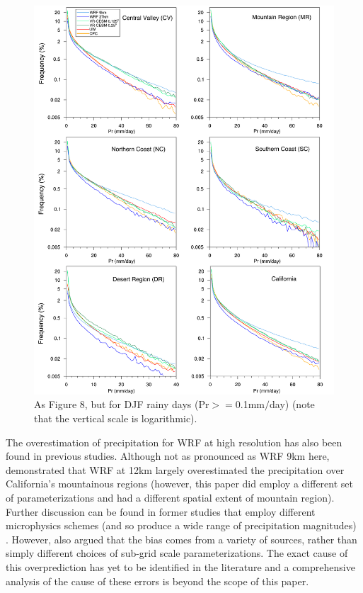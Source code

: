 \begin{figure}
\begin{center}
\includegraphics[width=6in]{PDF_pr_allzones_DJF.pdf}
\end{center}
\caption{As Figure 8, but for DJF rainy days (Pr$>=$0.1mm$/$day) (note that the vertical scale is logarithmic).} \label{fig:Figure 12}
\end{figure}

The overestimation of precipitation for WRF at high resolution has also been found in previous studies. Although not as pronounced as WRF 9km here, \cite{caldwell2009evaluation} demonstrated that WRF at 12km largely overestimated the precipitation over California's mountainous regions (however, this paper did employ a different set of parameterizations and had a different spatial extent of mountain region). Further discussion can be found in former studies that employ different microphysics schemes (and so produce a wide range of precipitation magnitudes) \cite{jankov2005impact, chin2010preliminary, caldwell2010california}. However, \cite{caldwell2009evaluation} also argued that the bias comes from a variety of sources, rather than simply different choices of sub-grid scale parameterizations. The exact cause of this overprediction has yet to be identified in the literature and a comprehensive analysis of the cause of these errors is beyond the scope of this paper. 

